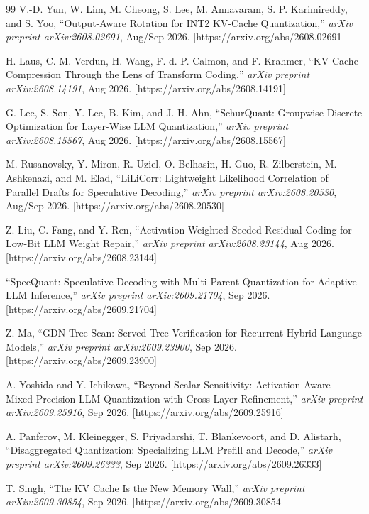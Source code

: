 \documentclass[10pt,a4paper]{article}
\begin{document}
\begin{thebibliography}{99}
V.-D. Yun, W. Lim, M. Cheong, S. Lee, M. Annavaram, S. P. Karimireddy, and S. Yoo, ``Output-Aware Rotation for INT2 KV-Cache Quantization,'' \emph{arXiv preprint arXiv:2608.02691}, Aug/Sep 2026. [https://arxiv.org/abs/2608.02691]

H. Laus, C. M. Verdun, H. Wang, F. d. P. Calmon, and F. Krahmer, ``KV Cache Compression Through the Lens of Transform Coding,'' \emph{arXiv preprint arXiv:2608.14191}, Aug 2026. [https://arxiv.org/abs/2608.14191]

G. Lee, S. Son, Y. Lee, B. Kim, and J. H. Ahn, ``SchurQuant: Groupwise Discrete Optimization for Layer-Wise LLM Quantization,'' \emph{arXiv preprint arXiv:2608.15567}, Aug 2026. [https://arxiv.org/abs/2608.15567]

M. Rusanovsky, Y. Miron, R. Uziel, O. Belhasin, H. Guo, R. Zilberstein, M. Ashkenazi, and M. Elad, ``LiLiCorr: Lightweight Likelihood Correlation of Parallel Drafts for Speculative Decoding,'' \emph{arXiv preprint arXiv:2608.20530}, Aug/Sep 2026. [https://arxiv.org/abs/2608.20530]

Z. Liu, C. Fang, and Y. Ren, ``Activation-Weighted Seeded Residual Coding for Low-Bit LLM Weight Repair,'' \emph{arXiv preprint arXiv:2608.23144}, Aug 2026. [https://arxiv.org/abs/2608.23144]

``SpecQuant: Speculative Decoding with Multi-Parent Quantization for Adaptive LLM Inference,'' \emph{arXiv preprint arXiv:2609.21704}, Sep 2026. [https://arxiv.org/abs/2609.21704]

Z. Ma, ``GDN Tree-Scan: Served Tree Verification for Recurrent-Hybrid Language Models,'' \emph{arXiv preprint arXiv:2609.23900}, Sep 2026. [https://arxiv.org/abs/2609.23900]

A. Yoshida and Y. Ichikawa, ``Beyond Scalar Sensitivity: Activation-Aware Mixed-Precision LLM Quantization with Cross-Layer Refinement,'' \emph{arXiv preprint arXiv:2609.25916}, Sep 2026. [https://arxiv.org/abs/2609.25916]

A. Panferov, M. Kleinegger, S. Priyadarshi, T. Blankevoort, and D. Alistarh, ``Disaggregated Quantization: Specializing LLM Prefill and Decode,'' \emph{arXiv preprint arXiv:2609.26333}, Sep 2026. [https://arxiv.org/abs/2609.26333]

T. Singh, ``The KV Cache Is the New Memory Wall,'' \emph{arXiv preprint arXiv:2609.30854}, Sep 2026. [https://arxiv.org/abs/2609.30854]


\end{thebibliography}
\end{document}
